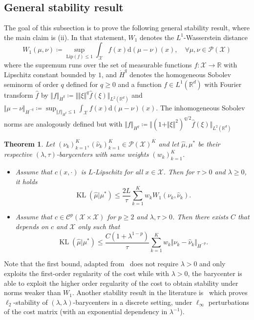 \documentclass[11pt]{article}
\newcommand{\RR}{\mathbb{R}}
\newcommand{\Cc}{\mathcal{C}}
\newcommand{\Pp}{\mathcal{P}}
\newcommand{\Xx}{\mathcal{X}}
\renewcommand{\d}{\mathrm{d}}
\DeclareMathOperator{\KL}{KL}
\newtheorem{theorem}{Theorem}[section]
\begin{document}
\subsection{General stability result}\label{sec:general-stability}
The goal of this subsection is to prove the following general stability result, where the main claim is (ii). In that statement, $W_1$ denotes the $L^1$-Wasserstein distance 
$$
W_1(\mu,\nu) \coloneqq \sup_{\mathrm{Lip}(f)\leq 1} \int_\Xx f(x)\d(\mu-\nu)(x),\quad \forall \mu,\nu \in \Pp(\Xx)
$$
where the supremum runs over the set of measurable functions $f:\Xx\to \RR$ with Lipschitz constant bounded by $1$, and $\dot H^{q}$ denotes the homogeneous Sobolev seminorm of order $q$ defined for $q\geq 0$ and a function $f\in L^1(\RR^d)$ with Fourier transform $\hat f$ by $\Vert f\Vert_{\dot H^q} \coloneqq \Vert \Vert \xi\Vert^{q} \hat f(\xi)\Vert_{L^2(\RR^d)}$ and $\Vert \mu-\nu \Vert_{\dot H^{-q}} \coloneqq \sup_{\Vert f\Vert_{\dot H^q}\leq 1}\int_{\Xx} f(x)\d(\mu-\nu)(x)$. The inhomogeneous Sobolev norms are analogously defined but with $\Vert f\Vert_{H^q} \coloneqq \Vert (1+\Vert \xi\Vert^2)^{q/2} \hat f(\xi)\Vert_{L^2(\RR^d)}$
\begin{assbox}
\begin{theorem}\label{thm:stability}
Let $(\nu_k)_{k=1}^K,(\hat \nu_k)_{k=1}^K \in \Pp(\Xx)^K$ and let $\hat \mu,\mu^*$ be their respective $(\lambda,\tau)$-barycenters with same weights $(w_k)_{k=1}^K$.
\begin{itemize}
\item[(i)] Assume that $c(x,\cdot)$ is $L$-Lipschitz for all $x\in \Xx$. Then for $\tau>0$ and $\lambda\geq 0$, it holds
$$
\KL(\hat \mu|\mu^*) \leq \frac{2L}{\tau}\sum_{k=1}^K w_k W_1(\nu_k,\hat \nu_k).
$$
\item[(ii)] Assume that $c\in \Cc^p(\Xx\times \Xx)$ for $p\geq 2$ and $\lambda,\tau>0$. Then there exists $C$  that depends on $c$ and $\Xx$ only such that
$$
\KL(\hat \mu|\mu^*) \leq \frac{C(1+\lambda^{1-p})}{\tau}\sum_{k=1}^K w_k \Vert \nu_k - \hat \nu_k\Vert_{\dot H^{-p}}.
$$
\end{itemize}
\end{theorem}
\end{assbox}
Note that the first bound, adapted from~\cite[Thm.~3.3]{bigot2019penalization} does not require $\lambda>0$ and only exploits the first-order regularity of the cost while with $\lambda>0$, the barycenter is able to exploit the higher order regularity of the cost to obtain stability under norms weaker than $W_1$. Another stability result in the literature is~\cite[Thm.~1]{theveneau2022stability} which proves $\ell_2$-stability of $(\lambda,\lambda)$-barycenters in a discrete setting, under $\ell_\infty$ perturbations of the cost matrix (with an exponential dependency in $\lambda^{-1}$).
\end{document}
